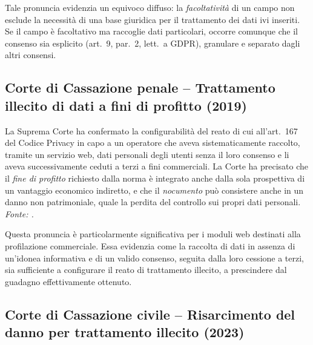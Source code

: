\documentclass[12pt, a4paper]{article}
\begin{document}
\medskip

Tale pronuncia evidenzia un equivoco diffuso: la \emph{facoltatività} di un
campo non esclude la necessità di una base giuridica per il trattamento dei
dati ivi inseriti. Se il campo è facoltativo ma raccoglie dati particolari, occorre
comunque che il consenso sia esplicito (art.~9, par.~2, lett.~a GDPR),
granulare e separato dagli altri consensi.

\subsection{Corte di Cassazione penale -- Trattamento illecito di dati a fini di profitto (2019)}
\label{sub:cass2019}

\begin{sentenzabox}
  La Suprema Corte ha confermato la configurabilità del reato di cui all'art.~167
  del Codice Privacy in capo a un operatore che aveva sistematicamente raccolto,
  tramite un servizio web, dati personali degli utenti senza il loro consenso e li
  aveva successivamente ceduti a terzi a fini commerciali. La Corte ha precisato
  che il \emph{fine di profitto} richiesto dalla norma è integrato anche dalla sola
  prospettiva di un vantaggio economico indiretto, e che il \emph{nocumento}
  può consistere anche in un danno non patrimoniale, quale la perdita del controllo
  sui propri dati personali.
  \newline
  {\scriptsize \textit{Fonte: \autocite{cass_pen_2019_1285}.}}
\end{sentenzabox}

\medskip

Questa pronuncia è particolarmente significativa per i moduli web destinati alla profilazione 
commerciale. Essa evidenzia come la raccolta di dati in assenza di un'idonea informativa e 
di un valido consenso, seguita dalla loro cessione a terzi, sia sufficiente a configurare 
il reato di trattamento illecito, a prescindere dal guadagno effettivamente ottenuto.

\subsection{Corte di Cassazione civile -- Risarcimento del danno per trattamento illecito (2023)}
\label{sub:cass2023}
\end{document}
